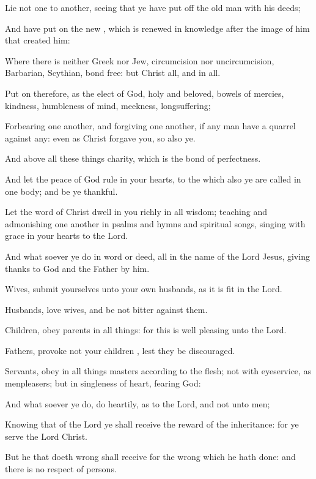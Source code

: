 {Lie
not
one
to
another, seeing that ye have put
off the
old
man
with
his
deeds;

And have put
on the
new
{}, which is
renewed
in
knowledge
after the
image of him that
created
him:

Where there
is
neither
Greek
nor
Jew,
circumcision
nor
uncircumcision,
Barbarian,
Scythian,
bond
{}
free:
but
Christ
{}
all,
and
in
all.

Put
on
therefore,
as the
elect of
God,
holy
and
beloved,
bowels of
mercies,
kindness, humbleness of
mind,
meekness,
longsuffering;

Forbearing one
another,
and
forgiving one
another,
if any
man
have a
quarrel
against
any:
even
as
Christ
forgave
you,
so
also
{}
ye.

And
above
all these
things
{}
charity,
which
is the
bond of
perfectness.

And
let the
peace of
God
rule
in
your
hearts,
to the
which
also ye are
called
in
one
body;
and be
ye
thankful.

Let the
word of
Christ
dwell
in
you
richly
in
all
wisdom;
teaching
and
admonishing one
another in
psalms
and
hymns
and
spiritual
songs,
singing
with
grace
in
your
hearts to the
Lord.

And
what
soever ye
do
in
word
or
deed,
{}
all
in the
name of the
Lord
Jesus, giving
thanks to
God
and the
Father
by
him.


\par }{\PP {}Wives, submit
yourselves unto your
own
husbands,
as it is
fit
in the
Lord.

Husbands,
love
{}
wives,
and
be
not
bitter
against
them.

Children,
obey
{}
parents
in all
things:
for
this
is well
pleasing unto the
Lord.

Fathers,
provoke
not
your
children
{},
lest they be
discouraged.

Servants,
obey
in all
things
{}
masters according
to the
flesh;
not
with
eyeservice,
as
menpleasers;
but
in
singleness of
heart,
fearing
God:

And
what
soever ye
do,
do
{}
heartily,
as to the
Lord,
and
not unto
men;

Knowing
that
of the
Lord ye shall
receive the
reward of the
inheritance:
for ye
serve the
Lord
Christ.

But he that doeth
wrong shall receive for the
wrong
which he hath
done:
and there
is
no respect of
persons.




}
